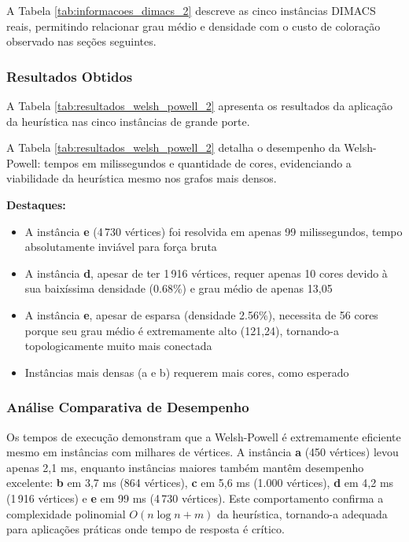 \documentclass[12pt]{article}
\begin{document}


A Tabela \ref{tab:informacoes_dimacs_2} descreve as cinco instâncias DIMACS reais, permitindo relacionar grau médio e densidade com o custo de coloração observado nas seções seguintes.

\subsubsection{Resultados Obtidos}

A Tabela \ref{tab:resultados_welsh_powell_2} apresenta os resultados da aplicação da heurística nas cinco instâncias de grande porte.



A Tabela \ref{tab:resultados_welsh_powell_2} detalha o desempenho da Welsh-Powell: tempos em milissegundos e quantidade de cores, evidenciando a viabilidade da heurística mesmo nos grafos mais densos.

\textbf{Destaques:}

\begin{itemize}
    \item A instância \textbf{e} (4\,730 vértices) foi resolvida em apenas 99 milissegundos, tempo absolutamente inviável para força bruta
    \item A instância \textbf{d}, apesar de ter 1\,916 vértices, requer apenas 10 cores devido à sua baixíssima densidade (0.68\%) e grau médio de apenas 13,05
    \item A instância \textbf{e}, apesar de esparsa (densidade 2.56\%), necessita de 56 cores porque seu grau médio é extremamente alto (121,24), tornando-a topologicamente muito mais conectada
    \item Instâncias mais densas (a e b) requerem mais cores, como esperado
\end{itemize}

\subsubsection{Análise Comparativa de Desempenho}

Os tempos de execução demonstram que a Welsh-Powell é extremamente eficiente mesmo em instâncias com milhares de vértices. A instância \textbf{a} (450 vértices) levou apenas 2,1 ms, enquanto instâncias maiores também mantêm desempenho excelente: \textbf{b} em 3,7 ms (864 vértices), \textbf{c} em 5,6 ms (1.000 vértices), \textbf{d} em 4,2 ms (1\,916 vértices) e \textbf{e} em 99 ms (4\,730 vértices). Este comportamento confirma a complexidade polinomial $O(n \log n + m)$ da heurística, tornando-a adequada para aplicações práticas onde tempo de resposta é crítico.
\end{document}

